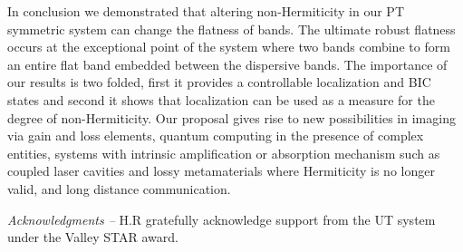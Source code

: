 \documentclass[aps,prl,twocolumn,showpacs,groupedaddress,amsmath,amssymb]{revtex4}
\begin{document}
In conclusion we demonstrated that altering non-Hermiticity in our PT symmetric system can change the flatness of bands. The ultimate robust flatness occurs at the exceptional point of the system where two bands combine to form an entire flat band embedded between the dispersive bands. The importance of our results is two folded, first it provides a controllable localization and BIC states and second it shows that localization can be used as a measure for the degree of non-Hermiticity.  Our proposal gives rise to new possibilities in imaging via gain and loss elements, quantum computing in the presence of complex entities, systems with intrinsic amplification or absorption mechanism such as coupled laser cavities and lossy metamaterials where Hermiticity is no longer valid, and long distance communication.





{\it Acknowledgments --} 
H.R gratefully acknowledge support from the UT system under the Valley STAR award.
\end{document}
